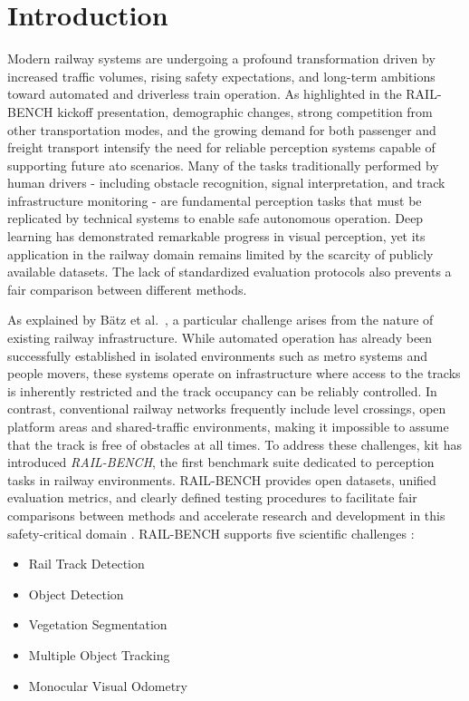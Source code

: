 \chapter{Introduction}
\label{ch:introduction}

Modern railway systems are undergoing a profound transformation driven by increased traffic volumes, rising safety expectations, and long-term ambitions toward automated and driverless train operation. As highlighted in the RAIL-BENCH kickoff presentation, demographic changes, strong competition from other transportation modes, and the growing demand for both passenger and freight transport intensify the need for reliable perception systems capable of supporting future \acrfull{ato} scenarios. Many of the tasks traditionally performed by human drivers - including obstacle recognition, signal interpretation, and track infrastructure monitoring - are fundamental perception tasks that must be replicated by technical systems to enable safe autonomous operation. Deep learning has demonstrated remarkable progress in visual perception, yet its application in the railway domain remains limited by the scarcity of publicly available datasets. The lack of standardized evaluation protocols also prevents a fair comparison between different methods. \cite{railbench-kickoff}


As explained by Bätz et al.~\cite{railbench-object-paper}, a particular challenge arises from the nature of existing railway infrastructure.
While automated operation has already been successfully established in isolated environments such as metro systems and people movers, these systems operate on infrastructure where access to the tracks is inherently restricted and the track occupancy can be reliably controlled. In contrast, conventional railway networks frequently include level crossings, open platform areas and shared-traffic environments, making it impossible to assume that the track is free of obstacles at all times. To address these challenges, \acrfull{kit} has introduced \emph{RAIL-BENCH}, the first benchmark suite dedicated to perception tasks in railway environments. RAIL-BENCH provides open datasets, unified evaluation metrics, and clearly defined testing procedures to facilitate fair comparisons between methods and accelerate research and development in this safety-critical domain \cite{railbench-object-paper}. RAIL-BENCH supports five scientific challenges \cite{railbench-object-paper}:
\begin{itemize}
    \item Rail Track Detection
    \item Object Detection
    \item Vegetation Segmentation
    \item Multiple Object Tracking
    \item Monocular Visual Odometry
\end{itemize}


